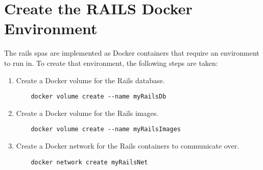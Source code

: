 \section{Create the RAILS Docker Environment}
\label{sec:railsdockerenv}
The \gls{rails} \glspl{spa} are implemented as Docker containers that require an environment to run in. To create that environment, the following steps are taken:
\begin{enumerate}
    \item Create a Docker volume for the Rails database.
    \begin{verbatim}
    docker volume create --name myRailsDb  
    \end{verbatim}
    \item Create a Docker volume for the Rails images.
    \begin{verbatim}
    docker volume create --name myRailsImages
    \end{verbatim}
    \item Create a Docker network for the Rails containers to communicate over.
    \begin{verbatim}
    docker network create myRailsNet
    \end{verbatim}
\end{enumerate}

